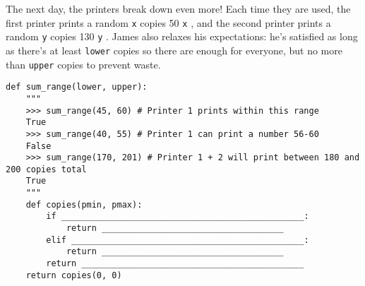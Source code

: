\begin{blocksection}
\question The next day, the printers break down even more! Each time they are used, the first printer 
prints a random \lstinline$x$ copies 50 \leq \lstinline$x$ , and the second printer prints a 
random \lstinline$y$ copies 130 \leq \lstinline$y$ . James also relaxes his expectations: he's
satisfied as long as there's at least \lstinline$lower$ copies so there are enough for everyone, but no
more than \lstinline$upper$ copies to prevent waste. \\

\begin{lstlisting}
def sum_range(lower, upper):
    """
    >>> sum_range(45, 60) # Printer 1 prints within this range
    True
    >>> sum_range(40, 55) # Printer 1 can print a number 56-60
    False
    >>> sum_range(170, 201) # Printer 1 + 2 will print between 180 and 200 copies total
    True
    """
    def copies(pmin, pmax):
        if ________________________________________________:
            return ____________________________________
        elif ______________________________________________:
            return ____________________________________
        return ____________________________________________
    return copies(0, 0)
    
\end{lstlisting}

\end{blocksection}
